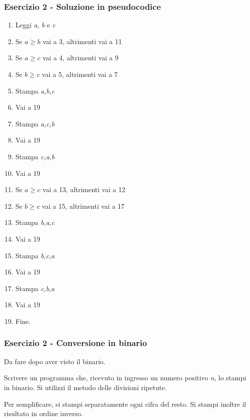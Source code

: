 \documentclass[]{beamer}
\begin{document}
\begin{frame}
\frametitle{Esercizio 2 - Soluzione in pseudocodice}
\begin{multicols}{2}
\begin{enumerate}
	\item Leggi \emph{a}, \emph{b} e \emph{c}
	\item Se $a \geq b$ vai a 3, altrimenti vai a 11
	
	\item Se $a \geq c$ vai a 4, altrimenti vai a 9
	\item Se $b \geq c$ vai a 5, altrimenti vai a 7
	\item Stampa \emph{a,b,c}
	\item Vai a 19
	\item Stampa \emph{a,c,b}
	\item Vai a 19
	\item Stampa \emph{c,a,b}
	\item Vai a 19
	
	\item Se $a \geq c$ vai a 13, altrimenti vai a 12
	\item Se $b \geq c$ vai a 15, altrimenti vai a 17
	\item Stampa \emph{b,a,c}
	\item Vai a 19
	\item Stampa \emph{b,c,a}
	\item Vai a 19
	\item Stampa \emph{c,b,a}
	\item Vai a 19
	
	\item Fine.
\end{enumerate}
\end{multicols}
\end{frame}

\fi

\begin{frame}
\frametitle{Esercizio 2 - Conversione in binario}
\alert{Da fare dopo aver visto il binario.}

Scrivere un programma che, ricevuto in ingresso un numero positivo \emph{n}, lo stampi in binario. Si utilizzi il metodo delle divisioni ripetute.

Per semplificare, si stampi separatamente ogni cifra del resto. Si stampi inoltre il risultato in ordine inverso.
\end{frame}
\end{document}

